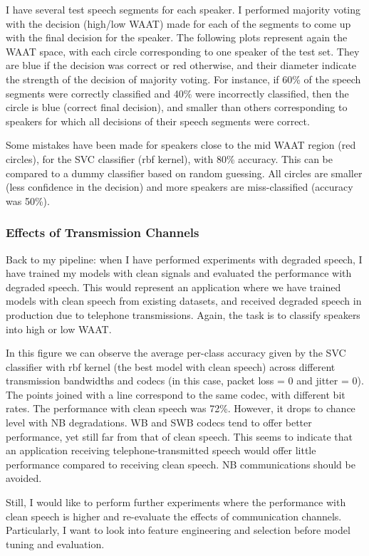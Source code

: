 \documentclass[a4paper]{article}
\begin{document}
I have several test speech segments for each speaker. I performed majority voting with the decision (high/low WAAT) made for each of the segments to come up with the final decision for the speaker. The following plots represent again the WAAT space, with each circle corresponding to one speaker of the test set. They are blue if the decision was correct or red otherwise, and their diameter indicate the strength of the decision of majority voting. For instance, if 60\% of the speech segments were correctly classified and 40\% were incorrectly classified, then the circle is blue (correct final decision), and smaller than others corresponding to speakers for which all decisions of their speech segments were correct.

Some mistakes have been made for speakers close to the mid WAAT region (red circles), for the SVC classifier (rbf kernel), with 80\% accuracy. This can be compared to a dummy classifier based on random guessing. All circles are smaller (less confidence in the decision) and more speakers are miss-classified (accuracy was 50\%).


\subsubsection{Effects of Transmission Channels}

Back to my pipeline: when I have performed experiments with degraded speech, I have trained my models with clean signals and evaluated the performance with degraded speech. This would represent an application where we have trained models with clean speech from existing datasets, and received degraded speech in production due to telephone transmissions. Again, the task is to classify speakers into high or low WAAT.

In this figure we can observe the average per-class accuracy given by the SVC classifier with rbf kernel (the best model with clean speech) across different transmission bandwidths and codecs (in this case, packet loss = 0 and jitter = 0). The points joined with a line correspond to the same codec, with different bit rates. The performance with clean speech was 72\%. However, it drops to chance level with NB degradations. WB and SWB codecs tend to offer better performance, yet still far from that of clean speech. This seems to indicate that an application receiving telephone-transmitted speech would offer little performance compared to receiving clean speech. NB communications should be avoided.

Still, I would like to perform further experiments where the performance with clean speech is higher and re-evaluate the effects of communication channels. Particularly, I want to look into feature engineering and selection before model tuning and evaluation.
\end{document}
